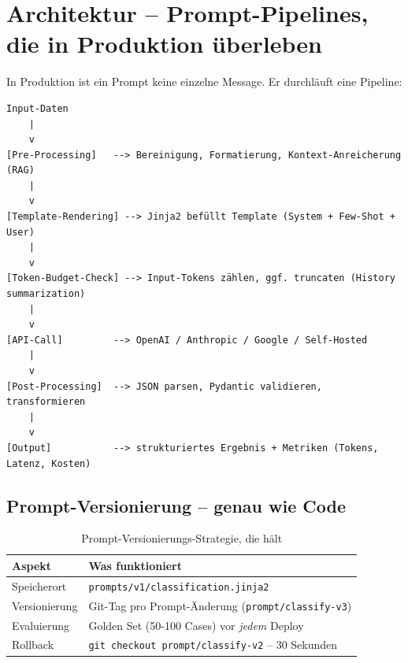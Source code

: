 \section{Architektur -- Prompt-Pipelines, die in Produktion überleben}

In Produktion ist ein Prompt keine einzelne Message. Er durchläuft eine Pipeline:

\begin{verbatim}
Input-Daten
    |
    v
[Pre-Processing]   --> Bereinigung, Formatierung, Kontext-Anreicherung (RAG)
    |
    v
[Template-Rendering] --> Jinja2 befüllt Template (System + Few-Shot + User)
    |
    v
[Token-Budget-Check] --> Input-Tokens zählen, ggf. truncaten (History summarization)
    |
    v
[API-Call]         --> OpenAI / Anthropic / Google / Self-Hosted
    |
    v
[Post-Processing]  --> JSON parsen, Pydantic validieren, transformieren
    |
    v
[Output]           --> strukturiertes Ergebnis + Metriken (Tokens, Latenz, Kosten)
\end{verbatim}


\subsection{Prompt-Versionierung -- genau wie Code}

\begin{table}[H]
\centering
\begin{tabularx}{\linewidth}{lX}
\toprule
\textbf{Aspekt} & \textbf{Was funktioniert} \\
\midrule
Speicherort & \texttt{prompts/v1/classification.jinja2} \\
Versionierung & Git-Tag pro Prompt-Änderung (\texttt{prompt/classify-v3}) \\
Evaluierung & Golden Set (50-100 Cases) vor \textit{jedem} Deploy \\
Rollback & \texttt{git checkout prompt/classify-v2} -- 30 Sekunden \\
\midrule
\end{tabularx}
\caption{Prompt-Versionierungs-Strategie, die hält}
\label{tab:prompt-versioning}
\end{table}


